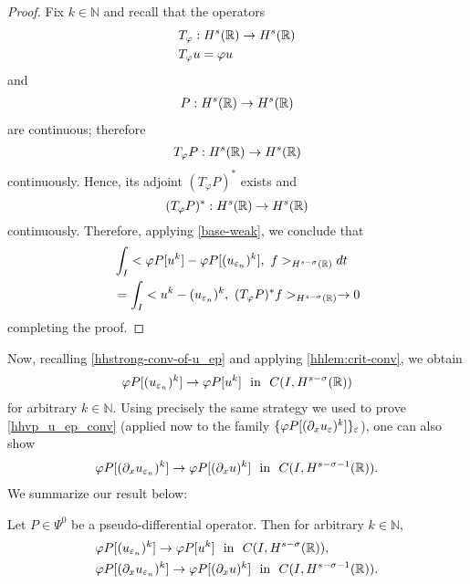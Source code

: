 \begin{proof} 
Fix $k \in \mathbb{N}$ and recall that the operators 
\begin{equation*}
\begin{split}
& T_\varphi: H^s(\mathbb{R}) \to H^s(\mathbb{R})\\
& T_\varphi u = \varphi u
\end{split}
\end{equation*}
and 
\begin{equation*}
\begin{split}
P:H^s(\mathbb{R}) \to H^s(\mathbb{R})
\end{split}
\end{equation*}
are continuous; therefore 
\begin{equation*}
\begin{split}
T_\varphi P: H^s(\mathbb{R}) \to H^s(\mathbb{R})
\end{split}
\end{equation*}
continuously. Hence, its adjoint  $(T_\varphi P)^*$
exists and
\begin{equation*}
(T_\varphi P)^*: H^s(\mathbb{R}) \to H^s(\mathbb{R}) 
\end{equation*}
continuously. Therefore, applying \eqref{base-weak}, we conclude that
\begin{equation}
\label{widpseudo}
\begin{split}
& \int_I <\varphi P[u^k] - \varphi
P [(u_{\varepsilon_n})^k],\  f>_{H^{s-\sigma }(\mathbb{R})} dt
\\
&= \int_I <u^k - 
(u_{\varepsilon_n})^k, \ (T_\varphi P)^* f>_{H^{s-\sigma }(\mathbb{R})} \to 0
\end{split}
\end{equation}
completing the proof. 
\end{proof}
%
%
Now, recalling \eqref{hhstrong-conv-of-u_ep} and applying \cref{hhlem:crit-conv}, we obtain
\begin{equation}
\begin{split}
\varphi P [(u_{\varepsilon_n})^k] \to \varphi P [u^k] \ \ \text{in}  \ \ C(I,
H^{s-\sigma}(\mathbb{R}))
\label{hhvp_u_ep_conv}
\end{split}
\end{equation}
for arbitrary $k \in \mathbb{N}$.  Using precisely the same
strategy we used to prove \eqref{hhvp_u_ep_conv} (applied now to
the family $\{ \varphi P [(\partial_x u_{\varepsilon})^k] \}_\varepsilon$), one can also show
\begin{equation}
\begin{split}
\vp P [ (\p_x u_{\ee_n})^k] \to \vp P [(\p_x u)^k] \ \ \text{in}  \ \ C(I,
H^{s-\sigma -1 }(\rr)).
\end{split}
\end{equation}
We summarize our result below:
\begin{theorem}
\label{hhthm:crit1}
Let $P \in \Psi^0$ be a pseudo-differential operator. Then for
arbitrary $k \in \mathbb{N}$, 
\begin{equation}
\begin{split}
& \varphi P [(u_{\varepsilon_n})^k] \to \varphi P [u^k] \ \ \text{in}  \ \ C(I,
H^{s-\sigma }(\mathbb{R})),
\\
& 
\varphi P [(\partial_x u_{\varepsilon_n})^k] \to \varphi P [(\partial_x u)^k] \ \
\text{in}  \ \ C(I,
H^{s-\sigma -1}(\mathbb{R})).
\end{split}
\end{equation}
\end{theorem}
